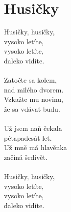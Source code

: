 \section{Husičky}
Husičky, husičky,\\
vysoko letíte,\\
vysoko letíte,\\
daleko vidíte.\\
\\
Zatočte sa kolem,\\
nad milého dvorem.\\
Vzkažte mu novinu,\\
že sa vdávat budu.\\
\\
Už jsem naň čekala\\
pětapadesát let.\\
Už mně má hlavěnka\\
začíná šedivět.\\
\\
Husičky, husičky,\\
vysoko letíte,\\
vysoko letíte,\\
daleko vidíte.\\